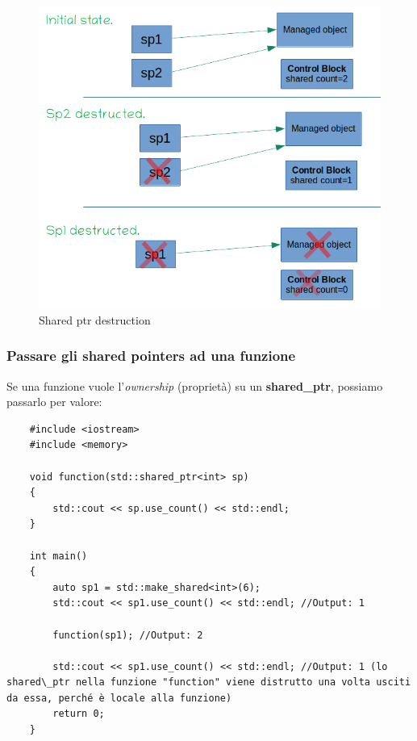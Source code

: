 \begin{figure}[H]
	\centering
	\includegraphics[width=1\textwidth, height=1\textheight, keepaspectratio]{./imgs/shared_ptr_destruction.png}
	\caption{Shared ptr destruction}
	\label{fig:shared_ptr_destruction}
\end{figure}

\subsubsection{Passare gli shared pointers ad una funzione}

\textsf{\small Se una funzione vuole l'\emph{ownership} (proprietà) su un \textbf{shared\_ptr}, possiamo passarlo per valore: } \\

\begin{lstlisting}
	#include <iostream>
	#include <memory>
	
	void function(std::shared_ptr<int> sp)
	{
		std::cout << sp.use_count() << std::endl;
	}

	int main()
	{
		auto sp1 = std::make_shared<int>(6);
		std::cout << sp1.use_count() << std::endl; //Output: 1
		
		function(sp1); //Output: 2
		
		std::cout << sp1.use_count() << std::endl; //Output: 1 (lo shared\_ptr nella funzione "function" viene distrutto una volta usciti da essa, perché è locale alla funzione)
		return 0;
	}
\end{lstlisting}

